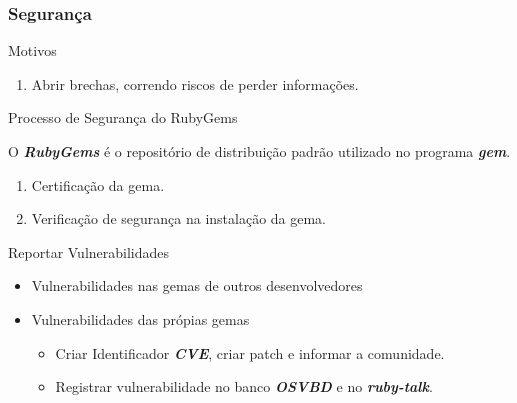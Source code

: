 \begin{frame}
 \frametitle{Segurança}

  \begin{block}{Motivos}

   \begin{enumerate}

    \item Abrir brechas, correndo riscos de perder informações.

   \end{enumerate}

  \end{block}

  \begin{block}{Processo de Segurança do RubyGems}

   O \emph{\textbf{RubyGems}} é o repositório de distribuição padrão utilizado no
   programa \emph{\textbf{gem}}.

   \begin{enumerate}

    \item Certificação da gema.

    \item Verificação de segurança na instalação da gema.

   \end{enumerate}

  \end{block}

  \begin{block}{Reportar Vulnerabilidades}

   \begin{itemize}

    \item Vulnerabilidades nas gemas de outros desenvolvedores

    \item Vulnerabilidades das própias gemas
    
    \begin{itemize}
     \item Criar Identificador \emph{\textbf{CVE}}, criar patch e informar a comunidade.
     \item Registrar vulnerabilidade no banco \emph{\textbf{OSVBD}} e no \emph{\textbf{ruby-talk}}.
    \end{itemize}


   \end{itemize}

  \end{block}

\end{frame}


